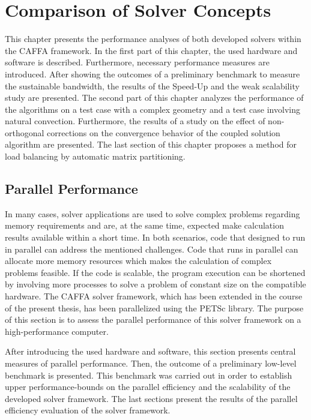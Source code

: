 \chapter{Comparison of Solver Concepts}
\label{sec:compare}

This chapter presents the performance analyses of both developed solvers within the CAFFA framework. In the first part of this chapter, the used hardware and software is described. Furthermore, necessary performance measures are introduced. After showing the outcomes of a preliminary benchmark to measure the sustainable bandwidth, the results of the Speed-Up and the weak scalability study are presented. The second part of this chapter analyzes the performance of the algorithms on a test case with a complex geometry and a test case involving natural convection. Furthermore, the results of a study on the effect of non-orthogonal corrections on the convergence behavior of the coupled solution algorithm are presented. The last section of this chapter proposes a method for load balancing by automatic matrix partitioning.
  
\section{Parallel Performance}
\label{sec:parallelperformance}

In many cases, solver applications are used to solve complex problems regarding memory requirements and are, at the same time, expected make calculation results available within a short time. In both scenarios, code that designed to run in parallel can address the mentioned challenges. Code that runs in parallel can allocate more memory resources which makes the calculation of complex problems feasible. If the code is scalable, the program execution can be shortened by involving more processes to solve a problem of constant size on the compatible hardware. The CAFFA solver framework, which has been extended in the course of the present thesis, has been parallelized using the PETSc library. The purpose of this section is to assess the parallel performance of this solver framework on a high-performance computer.

After introducing the used hardware and software, this section presents central measures of parallel performance. Then, the outcome of a preliminary low-level benchmark is presented. This benchmark was carried out in order to establish upper performance-bounds on the parallel efficiency and the scalability of the developed solver framework. The last sections present the results of the parallel efficiency evaluation of the solver framework.

